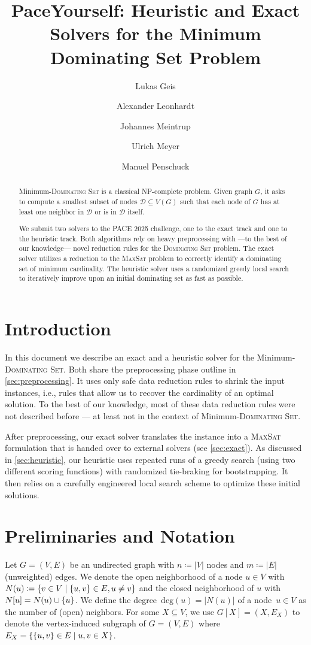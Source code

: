 \documentclass[a4paper, USenglish, cleveref, autoref, thm-restate, noalgorithm2e]{socg-lipics-v2021}
\title{PaceYourself: Heuristic and Exact Solvers for the Minimum Dominating Set Problem}
\author{Lukas Geis}{Goethe University Frankfurt, Germany}{lukas.geis@ae.cs.uni-frankfurt.de}{}{}%
\author{Alexander Leonhardt}{Goethe University Frankfurt, Germany}{alexander.leonhardt@ae.cs.uni-frankfurt.de}{}{}
\author{Johannes Meintrup}{THM, University of Applied Sciences Mittelhessen, Gie{\ss}en, Germany}{johannes.meintrup@mni.th.de}{https://orcid.org/0000-0003-4001-1153}{}
\author{Ulrich Meyer}{Goethe University Frankfurt, Germany}{umeyer@ae.cs.uni-frankfurt.de}{}{}
\author{Manuel Penschuck}{Goethe University Frankfurt, Germany}{mpenschuck@ae.cs.uni-frankfurt.de}{}{}
\newcommand{\setc}[2]{\ensuremath\left\{#1\;\middle|\;#2\right\}}
\newcommand{\set}[1]{\ensuremath\left\{#1\right\}}
\def\deg{\ensuremath{\mathrm{deg}}}
\newcommand{\Dom}{\textsc{Dominating Set}\xspace}
\newcommand{\MSat}{\textsc{MaxSat}\xspace}
\newcommand{\ie}{i.e.,\xspace}
\newcommand{\domset}{\ensuremath{\mathcal D}\xspace}
\begin{document}
\maketitle

\begin{abstract}
    Minimum-\Dom is a classical NP-complete problem.
    Given graph $G$, it asks to compute a smallest subset of nodes $\domset \subseteq V(G)$ such that each node of $G$ has at least one neighbor in \domset or is in \domset itself. 
    
    We submit two solvers to the PACE 2025 challenge, one to the exact track and one to the heuristic track.
    Both algorithms rely on heavy preprocessing with ---to the best of our knowledge--- novel reduction rules for the \Dom problem.
    The exact solver utilizes a reduction to the \MSat problem to correctly identify a dominating set of minimum cardinality.
    The heuristic solver uses a randomized greedy local search to iteratively improve upon an initial dominating set as fast as possible.
\end{abstract}

\section{Introduction}
In this document we describe an exact and a heuristic solver for the Minimum-\Dom.
Both share the preprocessing phase outline in \cref{sec:preprocessing}.
It uses only safe data reduction rules to shrink the input instances, \ie rules that allow us to recover the cardinality of an optimal solution.
To the best of our knowledge, most of these data reduction rules were not described before --- at least not in the context of Minimum-\Dom.

After preprocessing, our exact solver translates the instance into a \MSat formulation that is handed over to external solvers (see \cref{sec:exact}).
As discussed in \cref{sec:heuristic}, our heuristic uses repeated runs of a greedy search (using two different scoring functions) with randomized tie-braking for bootstrapping.
It then relies on a carefully engineered local search scheme to optimize these initial solutions.

\section{Preliminaries and Notation}
Let $G = (V, E)$ be an undirected graph with $n \coloneqq |V|$ nodes and $m \coloneqq |E|$ (unweighted) edges.
We denote the open neighborhood of a node $u \in V$ with $N(u) \coloneqq \setc{v \in V}{\set{u, v} \in E, u \neq v}$ and the closed neighborhood of $u$ with $N[u] = N(u) \cup \set{u}$.
We define the degree~$\deg(u) = |N(u)|$ of a node~$u \in V$ as the number of (open) neighbors.
For some $X \subseteq V$, we use $G[X] = (X, E_X)$ to denote the vertex-induced subgraph of $G = (V, E)$ where $E_X = \setc{ \set{u,v} \in E }{ u,v \in X }$.
\end{document}
